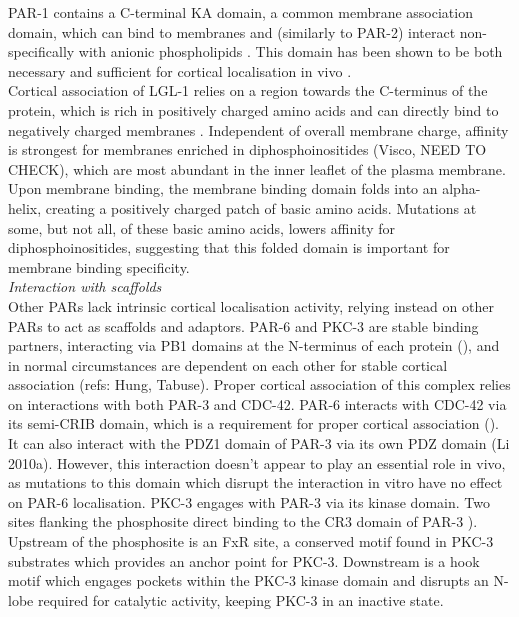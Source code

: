 \documentclass[12pt]{"report"}
\begin{document}
PAR-1 contains a C-terminal KA domain, a common membrane association domain, which can bind to membranes and (similarly to PAR-2) interact non-specifically with anionic phospholipids \parencite{Moravcevic2010}. This domain has been shown to be both necessary and sufficient for cortical localisation in vivo \parencite{Motegi2011}.\\

Cortical association of LGL-1 relies on a region towards the C-terminus of the protein, which is rich in positively charged amino acids and can directly bind to negatively charged membranes \parencite{Visco2016}. Independent of overall membrane charge, affinity is strongest for membranes enriched in diphosphoinositides (Visco, NEED TO CHECK), which are most abundant in the inner leaflet of the plasma membrane. Upon membrane binding, the membrane binding domain folds into an alpha-helix, creating a positively charged patch of basic amino acids. Mutations at some, but not all, of these basic amino acids, lowers affinity for diphosphoinositides, suggesting that this folded domain is important for membrane binding specificity. \\


\textit{Interaction with scaffolds}\\

Other PARs lack intrinsic cortical localisation activity, relying instead on other PARs to act as scaffolds and adaptors. PAR-6 and PKC-3 are stable binding partners, interacting via PB1 domains at the N-terminus of each protein (\cite{Hirano2005}), and in normal circumstances are dependent on each other for stable cortical association (refs: Hung, Tabuse). Proper cortical association of this complex relies on interactions with both PAR-3 and CDC-42. PAR-6 interacts with CDC-42 via its semi-CRIB domain, which is a requirement for proper cortical association (\cite{Aceto2006}). It can also interact with the PDZ1 domain of PAR-3 via its own PDZ domain (Li 2010a). However, this interaction doesn't appear to play an essential role in vivo, as mutations to this domain which disrupt the interaction in vitro have no effect on PAR-6 localisation. PKC-3 engages with PAR-3 via its kinase domain. Two sites flanking the phosphosite direct binding to the CR3 domain of PAR-3 \citep{Soriano2016}). Upstream of the phosphosite is an FxR site, a conserved motif found in PKC-3 substrates which provides an anchor point for PKC-3. Downstream is a hook motif which engages pockets within the PKC-3 kinase domain and disrupts an N-lobe required for catalytic activity, keeping PKC-3 in an inactive state.\\
\end{document}
